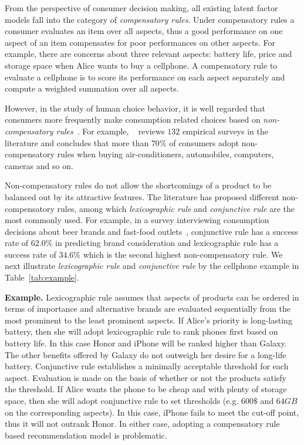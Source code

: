 \documentclass[letterpaper]{article} %
\begin{document}
From the perspective of consumer decision making, all existing latent factor models fall into the category of \emph{compensatory rules}. Under compensatory rules a consumer evaluates an item over all aspects, thus a good performance on one aspect of an item compensates for poor performances on other aspects. For example, there are concerns about three relevant aspects: battery life, price and storage space when Alice wants to buy a cellphone. A compensatory rule to evaluate a cellphone is to score its performance on each aspect separately and compute a weighted summation over all aspects.


However, in the study of human choice behavior, it is well regarded that consumers more frequently make consumption related choices based on \emph{non-compensatory rules}~\cite{Engel1986Consumer}. For example, ~\cite{Hauser2009Non} reviews $132$ empirical surveys in the literature and concludes that more than $70\%$ of consumers adopt non-compensatory rules when buying air-conditioners, automobiles, computers, cameras and so on. 

Non-compensatory rules do not allow the shortcomings of a product to be balanced out by its attractive features. The literature has proposed different non-compensatory rules, among which  \emph{lexicographic rule} and \emph{conjunctive rule} are the most commonly used. For example, in a survey interviewing consumption decisions about beer brands and fast-food outlets~\cite{Laroche2003Which}, conjunctive rule has a success rate of $62.0\%$ in predicting brand consideration and lexicographic rule has a success rate of $34.6\%$ which is the second highest non-compensatory rule. We next illustrate  \emph{lexicographic rule} and \emph{conjunctive rule}  by the cellphone example in Table~\ref{tab:example}. 

\textbf{Example.} Lexicographic rule assumes that aspects of products can be ordered in terms of importance and alternative brands are evaluated sequentially from the most prominent to the least prominent aspects.  If Alice's priority is long-lasting battery, then she will adopt lexicographic rule to rank phones first based on battery life. In this case Honor and iPhone will be ranked higher than Galaxy. The other benefits offered by Galaxy  do not outweigh her desire for a long-life battery. Conjunctive rule establishes a minimally acceptable threshold for each aspect. Evaluation is made on the basis of whether or not the products satisfy the threshold. If Alice wants the phone to be cheap and with plenty of storage space, then she will adopt conjunctive rule to set thresholds (e.g. $600\$$ and $64GB$ on the corresponding aspects). In this case, iPhone fails to meet the cut-off point, thus it will not outrank Honor. In either case, adopting a compensatory rule based recommendation model is problematic. 
\end{document}
